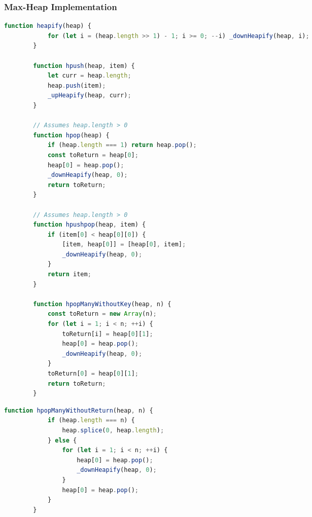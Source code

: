 \subsubsection{Max-Heap Implementation}%
\label{sub:standard-implementations--javascript--max-heap-impl}



\begin{multicols}{2}

    \begin{lstlisting}[language={Javascript}, caption={
        A simple Javascript \emph{max-heap} implementation.
    }]
        function heapify(heap) {
            for (let i = (heap.length >> 1) - 1; i >= 0; --i) _downHeapify(heap, i);
        }

        function hpush(heap, item) {
            let curr = heap.length;
            heap.push(item);
            _upHeapify(heap, curr);
        }

        // Assumes heap.length > 0
        function hpop(heap) {
            if (heap.length === 1) return heap.pop();
            const toReturn = heap[0];
            heap[0] = heap.pop();
            _downHeapify(heap, 0);
            return toReturn;
        }

        // Assumes heap.length > 0
        function hpushpop(heap, item) {
            if (item[0] < heap[0][0]) {
                [item, heap[0]] = [heap[0], item];
                _downHeapify(heap, 0);
            }
            return item;
        }

        function hpopManyWithoutKey(heap, n) {
            const toReturn = new Array(n);
            for (let i = 1; i < n; ++i) {
                toReturn[i] = heap[0][1];
                heap[0] = heap.pop();
                _downHeapify(heap, 0);
            }
            toReturn[0] = heap[0][1];
            return toReturn;
        }
    \end{lstlisting}

    \columnbreak

    \begin{lstlisting}[language={Javascript}]
        function hpopManyWithoutReturn(heap, n) {
            if (heap.length === n) {
                heap.splice(0, heap.length);
            } else {
                for (let i = 1; i < n; ++i) {
                    heap[0] = heap.pop();
                    _downHeapify(heap, 0);
                }
                heap[0] = heap.pop();
            }
        }   


\end{lstlisting}
\end{multicols}
